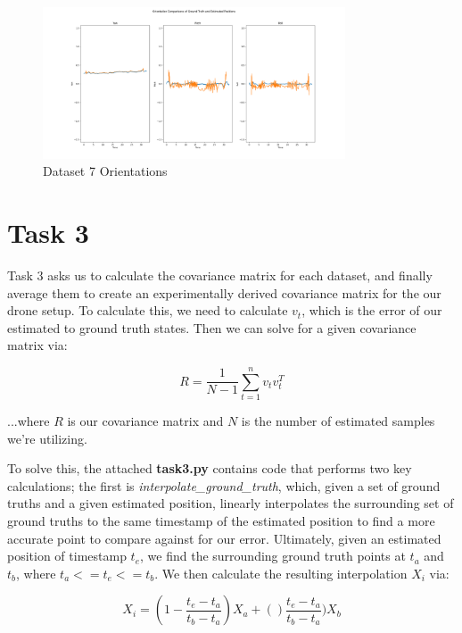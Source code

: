 \documentclass{article}
\begin{document}
\begin{figure}[H]
    \centering
    \includegraphics[width=0.8\textwidth]{./imgs/task1_2/studentdata7_orientation_merged.png}
    \caption{Dataset 7 Orientations}
\end{figure}


\section*{Task 3}

Task 3 asks us to calculate the covariance matrix for each dataset, and finally average them to create an experimentally derived covariance matrix for the our drone setup. To calculate this, we need to calculate $v_t$, which is the error of our estimated to ground truth states. Then we can solve for a given covariance matrix via:

\begin{equation}
    R = \frac{1}{N-1} \sum_{t=1}^n v_t v_t^T
\end{equation}

...where $R$ is our covariance matrix and $N$ is the number of estimated samples we're utilizing.

To solve this, the attached \textbf{task3.py} contains code that performs two key calculations; the first is \textit{interpolate\_ground\_truth}, which, given a set of ground truths and a given estimated position, linearly interpolates the surrounding set of ground truths to the same timestamp of the estimated position to find a more accurate point to compare against for our error. Ultimately, given an estimated position of timestamp $t_e$, we find the surrounding ground truth points at $t_a$ and $t_b$, where $t_a <= t_e <= t_b$. We then calculate the resulting interpolation $X_i$ via:

\begin{equation}
    X_i = (1 - \frac{t_e - t_a}{t_b - t_a})X_a + ()\frac{t_e - t_a}{t_b - t_a}) X_b
\end{equation}
\end{document}
